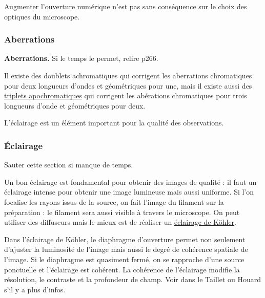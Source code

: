 \begin{transition}
Augmenter l'ouverture numérique n'est pas sans conséquence sur le choix des optiques du microscope.
\end{transition}

\subsubsection{Aberrations}

\begin{slide}
\textbf{Aberrations.}
Si le temps le permet, relire \cite{Hecht2002} p266.
\end{slide}

\begin{remarque}
Il existe des doublets achromatiques qui corrigent les aberrations chromatiques pour deux longueurs d'ondes et géométriques pour une, mais il existe aussi des \href{https://fr.wikipedia.org/wiki/Triplet_apochromatique}{triplets apochromatiques} qui corrigent les abérations chromatiques pour trois longueurs d'onde et géométriques pour deux.
\end{remarque}

\begin{transition}
L'éclairage est un élément important pour la qualité des observations.
\end{transition}

\subsubsection{Éclairage}

Sauter cette section si manque de temps.

Un bon éclairage est fondamental pour obtenir des images de qualité : il faut un éclairage intense pour obtenir une image lumineuse mais aussi uniforme.
Si l'on focalise les rayons issus de la source, on fait l'image du filament sur la préparation : le filament sera aussi visible à travers le microscope.
On peut utiliser des diffuseurs mais le mieux est de réaliser un \href{http://www.optique-ingenieur.org/fr/cours/OPI_fr_M03_C03/co/Contenu_03.html}{éclairage de Köhler}.

\begin{remarque}
Dans l'éclairage de Köhler, le diaphragme d'ouverture permet non seulement d'ajuster la luminosité de l'image mais aussi le degré de cohérence spatiale de l'image.
Si le diaphragme est quasiment fermé, on se rapproche d'une source ponctuelle et l'éclairage est cohérent.
La cohérence de l'éclairage modifie la résolution, le contraste et la profondeur de champ.
Voir dans le Taillet ou Houard s'il y a plus d'infos. 
\end{remarque}

